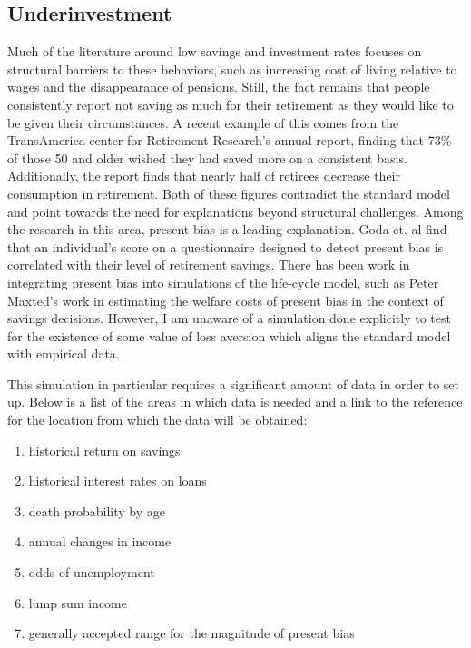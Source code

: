 \documentclass[10pt,twocolumn]{article}
\begin{document}
\subsection{Underinvestment}
Much of the literature around low savings and investment rates focuses on structural barriers to these behaviors, such as increasing cost of living relative to wages and the disappearance of pensions. Still, the fact remains that people consistently report not saving as much for their retirement as they would like to be given their circumstances. A recent example of this comes from the TransAmerica center for Retirement Research’s annual report\cite{transamerica}, finding that 73\% of those 50 and older wished they had saved more on a consistent basis. Additionally, the report finds that nearly half of retirees decrease their consumption in retirement. Both of these figures contradict the standard model and point towards the need for explanations beyond structural challenges. Among the research in this area, present bias is a leading explanation. Goda et. al\cite{goda} find that an individual’s score on a questionnaire designed to detect present bias is correlated with their level of retirement savings. There has been work in integrating present bias into simulations of the life-cycle model, such as Peter Maxted’s work in estimating the welfare costs of present bias in the context of savings decisions.\cite{maxted} However, I am unaware of a simulation done explicitly to test for the existence of some value of loss aversion which aligns the standard model with empirical data.

This simulation in particular requires a significant amount of data in order to set up. Below is a list of the areas in which data is needed and a link to the reference for the location from which the data will be obtained:
\begin{enumerate}
    \item historical return on savings\cite{returns}
    \item historical interest rates on loans\cite{personalloan}
    \item death probability by age\cite{death}
    \item annual changes in income\cite{income}
    \item odds of unemployment\cite{unemployment}
    \item lump sum income\cite{inheritance}
    \item generally accepted range for the magnitude of present bias\cite{presentbias}
\end{enumerate}
\end{document}
